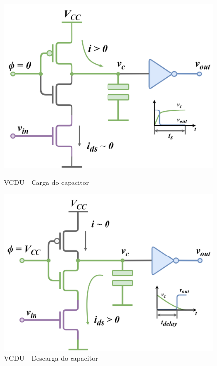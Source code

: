 \documentclass[
	12pt,				%
	openright,			%
	twoside,			%
	a4paper,			%
	english,			%
	french,				%
	spanish,			%
	brazil,				%
	]{abntex2}
\begin{document}
			\begin{figure}[!ht]
				\centering
				\begin{minipage}{0.4\linewidth}
					\centering
					\includegraphics[width = \linewidth]{images/charge.png}
					\caption{VCDU - Carga do capacitor}
					\label{vtc1_charge}
				\end{minipage}
				\hfill\vline\hfill
				\begin{minipage}{0.4\linewidth}
					\centering
					\includegraphics[width = \linewidth]{images/discharge.png}
					\caption{VCDU - Descarga do capacitor}
					\label{vtc1_discharge}
				\end{minipage}
			\end{figure}
\end{document}
